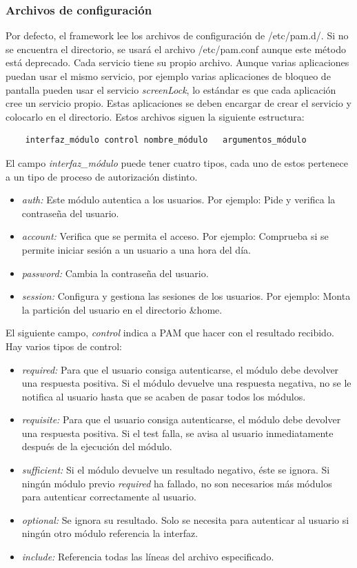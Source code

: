 \documentclass[titlepage, 12pt, a4paper]{article}
\begin{document}
\subsubsection{Archivos de configuración}
Por defecto, el framework lee los archivos de configuración de /etc/pam.d/. Si no se encuentra el directorio, se usará el archivo /etc/pam.conf aunque este método está deprecado. Cada servicio tiene su propio archivo. Aunque varias aplicaciones puedan usar el mismo servicio, por ejemplo varias aplicaciones de bloqueo de pantalla pueden usar el servicio \textit{screenLock}, lo estándar es que cada aplicación cree un servicio propio. Estas aplicaciones se deben encargar de crear el servicio y colocarlo en el directorio.
Estos archivos siguen la siguiente estructura:
\begin{lstlisting}
	interfaz_módulo	control	nombre_módulo	argumentos_módulo
\end{lstlisting} \par
El campo \textit{interfaz\_módulo} puede tener cuatro tipos, cada uno de estos pertenece a un tipo de proceso de autorización distinto.
\begin{itemize}
	\item{\textit{auth: }}Este módulo autentica a los usuarios. Por ejemplo: Pide y verifica la contraseña del usuario.
	\item{\textit{account: }}Verifica que se permita el acceso. Por ejemplo: Comprueba si se permite iniciar sesión a un usuario a una hora del día.
	\item{\textit{password: }}Cambia la contraseña del usuario.
	\item{\textit{session: }}Configura y gestiona las sesiones de los usuarios. Por ejemplo: Monta la partición del usuario en el directorio \&home.
\end{itemize} \par
El siguiente campo, \textit{control} indica a PAM que hacer con el resultado recibido. Hay varios tipos de control:
\begin{itemize}
	\item{\textit{required: }}Para que el usuario consiga autenticarse, el módulo debe devolver una respuesta positiva. Si el módulo devuelve una respuesta negativa, no se le notifica al usuario hasta que se acaben de pasar todos los módulos.
	\item{\textit{requisite: }}Para que el usuario consiga autenticarse, el módulo debe devolver una respuesta positiva. Si el test falla, se avisa al usuario inmediatamente después de la ejecución del módulo.
	\item{\textit{sufficient: }}Si el módulo devuelve un resultado negativo, éste se ignora. Si ningún módulo previo \textit{required} ha fallado, no son necesarios más módulos para autenticar correctamente al usuario.
	\item{\textit{optional: }}Se ignora su resultado. Solo se necesita para autenticar al usuario si ningún otro módulo referencia la interfaz.
	\item{\textit{include: }}Referencia todas las líneas del archivo especificado.
\end{itemize} \par
\end{document}
